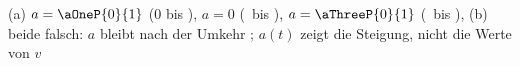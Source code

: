 (a) $a = \aOneP{0}{1}$ (0 bis \tOneO), $a = 0$ (\tOneO\ bis \tTwoO), $a = \aThreeP{0}{1}$ (\tTwoO\ bis \tEndO), (b) beide falsch: $a$ bleibt nach der Umkehr ; $a(t)$ zeigt die Steigung, nicht die Werte von $v$
